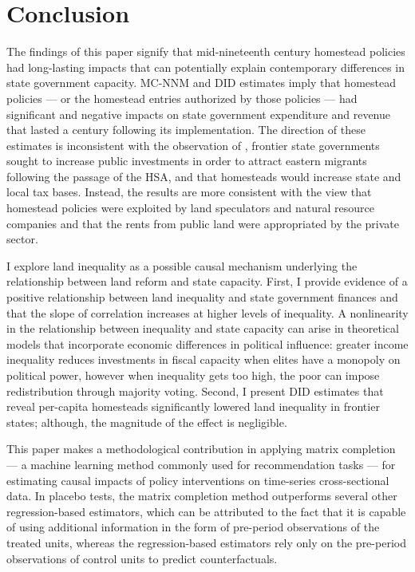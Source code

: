 \documentclass[hidelinks,12pt]{article}
\begin{document}
\section{Conclusion} \label{discussion} 

The findings of this paper signify that mid-nineteenth century homestead policies had long-lasting impacts that can potentially explain contemporary differences in state government capacity. MC-NNM and DID estimates imply that homestead policies --- or the homestead entries authorized by those policies --- had significant and negative impacts on state government expenditure and revenue that lasted a century following its implementation. The direction of these estimates is inconsistent with the observation of \citet{engerman2005evolution}, frontier state governments sought to increase public investments in order to attract eastern migrants following the passage of the HSA, and that homesteads would increase state and local tax bases. Instead, the results are more consistent with the view that homestead policies were exploited by land speculators and natural resource companies and that the rents from public land were appropriated by the private sector. 

I explore land inequality as a possible causal mechanism underlying the relationship between land reform and state capacity. First, I provide evidence of a positive relationship between land inequality and state government finances and that the slope of correlation increases at higher levels of inequality. A nonlinearity in the relationship between inequality and state capacity can arise in theoretical models that incorporate economic differences in political influence: greater income inequality reduces investments in fiscal capacity when elites have a monopoly on political power, however when inequality gets too high, the poor can impose redistribution through majority voting. Second, I present DID estimates that reveal per-capita homesteads significantly lowered land inequality in frontier states; although, the magnitude of the effect is negligible. 

This paper makes a methodological contribution in applying matrix completion --- a machine learning method commonly used for recommendation tasks --- for estimating causal impacts of policy interventions on time-series cross-sectional data. In placebo tests, the matrix completion method outperforms several other regression-based estimators, which can be attributed to the fact that it is capable of using additional information in the form of pre-period observations of the treated units, whereas the regression-based estimators rely only on the pre-period observations of control units to predict counterfactuals. 
\end{document}
